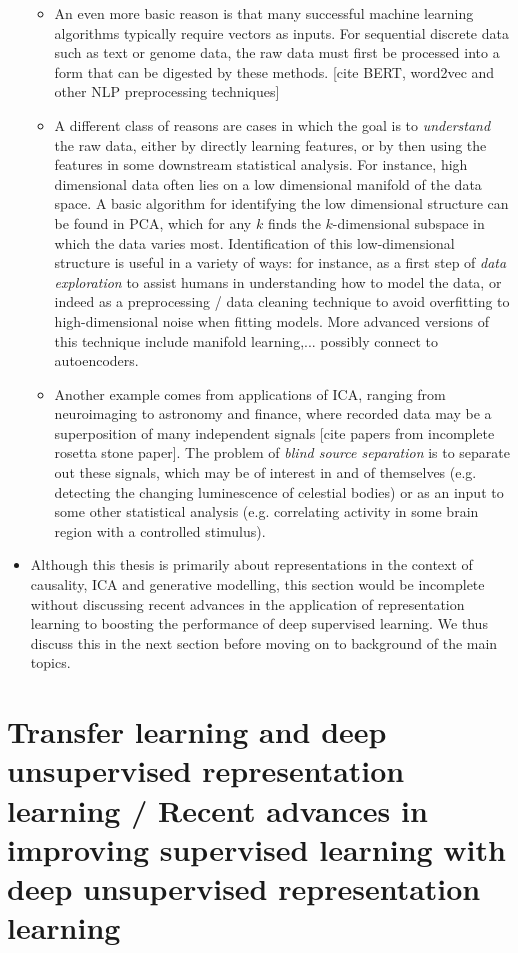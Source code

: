 \begin{itemize}
\begin{itemize}
	\item An even more basic reason is that many successful machine learning algorithms typically require vectors as inputs. For sequential discrete data such as text or genome data, the raw data must first be processed into a form that can be digested by these methods. [cite BERT, word2vec and other NLP preprocessing techniques]
	\item A different class of reasons are cases in which the goal is to \emph{understand} the raw data, either by directly learning features, or by then using the features in some downstream statistical analysis. For instance, high dimensional data often lies on a low dimensional manifold of the data space. A basic algorithm for identifying the low dimensional structure can be found in PCA, which for any $k$ finds the $k$-dimensional subspace in which the data varies most. Identification of this low-dimensional structure is useful in a variety of ways: for instance, as a first step of \emph{data exploration} to assist humans in understanding how to model the data, or indeed as a preprocessing / data cleaning technique to avoid overfitting to high-dimensional noise when fitting models. More advanced versions of this technique include manifold learning,... possibly connect to autoencoders.
	\item Another example comes from applications of ICA, ranging from neuroimaging to astronomy and finance, where recorded data may be a superposition of many independent signals [cite papers from incomplete rosetta stone paper]. The problem of \emph{blind source separation} is to separate out these signals, which may be of interest in and of themselves (e.g. detecting the changing luminescence of celestial bodies) or as an input to some other statistical analysis (e.g. correlating activity in some brain region with a controlled stimulus).
\end{itemize}
\item Although this thesis is primarily about representations in the context of causality, ICA and generative modelling, this section would be incomplete without discussing recent advances in the application of representation learning to boosting the performance of deep supervised learning. We thus discuss this in the next section before moving on to background of the main topics.
\end{itemize}


\section{Transfer learning and deep unsupervised representation learning / Recent advances in improving supervised learning with deep unsupervised representation learning}

